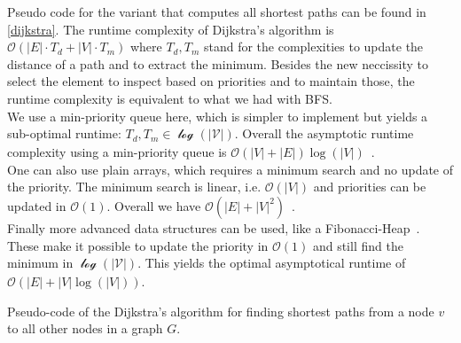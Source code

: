         Pseudo code for the variant that computes all shortest paths can be found in \ref{dijkstra}. 
        The runtime complexity of Dijkstra's algorithm is $\mathcal{O}(|E| \cdot T_d + |V| \cdot T_m)$ where $T_d, T_m$ stand for the complexities to update the distance of a path and to extract the minimum.
        Besides the new neccissity to select the element to inspect based on priorities and to maintain those, the runtime complexity is equivalent to what we had with BFS. \\
        
        We use a min-priority queue here, which is simpler to implement but yields a sub-optimal runtime: $T_d, T_m \in \mathcal{\log(|V|)}$. 
        Overall the asymptotic runtime complexity using a min-priority queue is $\mathcal{O}(|V| + |E|)\log(|V|)$~\autocite{Goodrich2014AlgorithmDA}. \\
        
        One can also use plain arrays, which requires a minimum search and no update of the priority. 
        The minimum search is linear, i.e. $\mathcal{O}(|V|)$ and priorities can be updated in $\mathcal{O}(1)$. 
        Overall we have $\mathcal{O}(|E| + |V|^2)$~\autocite{Goodrich2014AlgorithmDA}. \\
        
        Finally more advanced data structures can be used, like a Fibonacci-Heap~\autocite{cormen2009introduction}. 
        These make it possible to update the priority in $\mathcal{O}(1)$ and still find the minimum in $\mathcal{\log(|V|)}$. This yields the optimal asymptotical runtime of $\mathcal{O}(|E| + |V|\log(|V|))$. \\
        
        \begin{algorithm}[htp]
            \hrulealg
        \caption{Pseudo-code of the Dijkstra's algorithm for finding shortest paths from a node $v$ to all other nodes in a graph $G$.}\label{dijkstra}
        \end{algorithm}
        

